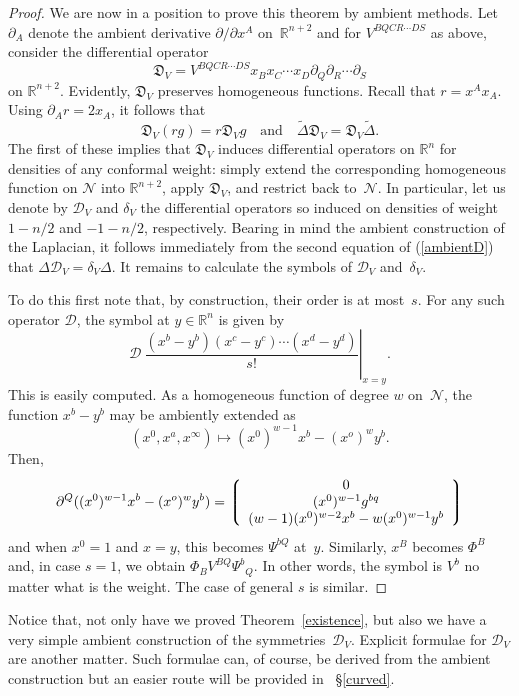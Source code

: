 \documentclass[a4paper,12pt]{amsart}
\begin{document}
\renewcommand{\proofname}{Proof of Theorem~\ref{existence}}\begin{proof}
We are now in a position to prove this theorem by ambient methods. Let
$\partial_A$ denote the ambient derivative $\partial/\partial x^A$
on~${\mathbb R}^{n+2}$ and for $V^{BQCR\cdots DS}$ as above, consider the
differential operator $${\mathfrak D}_V=V^{BQCR\cdots DS}
x_Bx_C\cdots x_D\partial_Q\partial_R\cdots\partial_S$$
on ${\mathbb R}^{n+2}$. Evidently, ${\mathfrak D}_V$ preserves homogeneous
functions. Recall that $r=x^Ax_A$. Using $\partial_Ar=2x_A$, it follows that
\begin{equation}\label{ambientD}
{\mathfrak D}_V(rg)=r{\mathfrak D}_Vg\quad\mbox{and}\quad
\widetilde\Delta{\mathfrak D}_V={\mathfrak D}_V\widetilde\Delta.\end{equation}
The first of these implies that ${\mathfrak D}_V$ induces differential
operators on ${\mathbb R}^n$ for densities of any conformal weight: simply
extend the corresponding homogeneous function on ${\mathcal N}$ into
${\mathbb R}^{n+2}$, apply ${\mathfrak D}_V$, and restrict back to~${\mathcal
N}$. In particular, let us denote by ${\mathcal D}_V$ and $\delta_V$ the
differential operators so induced on densities of weight $1-n/2$ and $-1-n/2$,
respectively. Bearing in mind the ambient construction of the Laplacian, it
follows immediately from the second equation of (\ref{ambientD}) that
$\Delta{\mathcal D}_V=\delta_V\Delta$. It remains to calculate the symbols
of ${\mathcal D}_V$ and~$\delta_V$.

To do this first note that, by construction, their order is at most~$s$. For
any such operator ${\mathcal D}$, the symbol at $y\in{\mathbb R}^n$ is given by
$$\left.{\mathcal D}\:
  \frac{(x^b-y^b)(x^c-y^c)\cdots (x^d-y^d)}{s!}\right|_{x=y}.$$
This is easily computed. As a homogeneous function of degree $w$
on~${\mathcal N}$, the function $x^b-y^b$ may be ambiently extended as
$$(x^0,x^a,x^\infty)\mapsto (x^0)^{w-1}x^b-(x^o)^wy^b.$$
Then,
$$\partial^Q((x^0)^{w-1}x^b-(x^o)^wy^b)=
\left\lgroup\begin{array}c0\\ (x^0)^{w-1}g^{bq}\\
(w-1)(x^0)^{w-2}x^b-w(x^0)^{w-1}y^b\end{array}\right\rgroup$$
and when $x^0=1$ and $x=y$, this becomes $\Psi^{bQ}$ at~$y$. Similarly, $x^B$
becomes $\Phi^B$ and, in case $s=1$, we obtain $\Phi_BV^{BQ}\Psi^b{}_Q$. In
other words, the symbol is $V^b$ no matter what is the weight.
The case of general $s$ is similar.
\end{proof}\renewcommand{\proofname}{Proof}
Notice that, not only have we proved Theorem~\ref{existence}, but also we
have a very simple ambient construction of the symmetries~${\mathcal D}_V$.
Explicit formulae for ${\mathcal D}_V$ are another matter. Such formulae can,
of course, be derived from the ambient construction but an easier route will be
provided in ~\S\ref{curved}.
\end{document}
